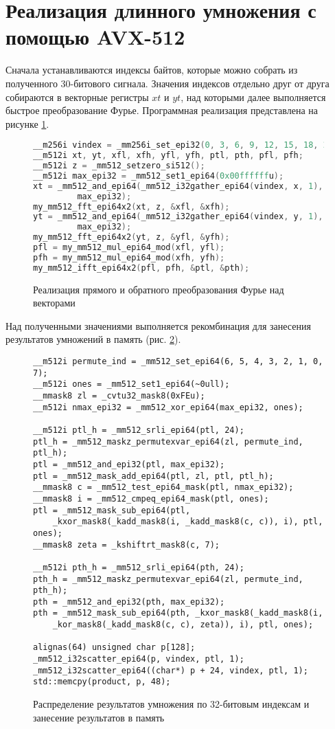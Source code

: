 \section{Реализация длинного умножения с помощью AVX-512}
Сначала устанавливаются индексы байтов, которые можно собрать из полученного 30-битового сигнала.
Значения индексов отдельно друг от друга собираются в векторные регистры $xt$ и $yt$, над которыми далее выполняется быстрое преобразование Фурье.
Программная реализация представлена на рисунке \ref{fig: vectorized ntt}.
\begin{figure}[ht]
\begin{lstlisting}[language=C]
__m256i vindex = _mm256i_set_epi32(0, 3, 6, 9, 12, 15, 18, 21);
__m512i xt, yt, xfl, xfh, yfl, yfh, ptl, pth, pfl, pfh;
__m512i z = _mm512_setzero_si512();
__m512i max_epi32 = _mm512_set1_epi64(0x00ffffffu);
xt = _mm512_and_epi64(_mm512_i32gather_epi64(vindex, x, 1),
         max_epi32);
my_mm512_fft_epi64x2(xt, z, &xfl, &xfh);
yt = _mm512_and_epi64(_mm512_i32gather_epi64(vindex, y, 1),
         max_epi32);
my_mm512_fft_epi64x2(yt, z, &yfl, &yfh);
pfl = my_mm512_mul_epi64_mod(xfl, yfl);
pfh = my_mm512_mul_epi64_mod(xfh, yfh);
my_mm512_ifft_epi64x2(pfl, pfh, &ptl, &pth);
\end{lstlisting}
\caption{Реализация прямого и обратного преобразования Фурье над векторами}
\label{fig: vectorized ntt}
\end{figure}

Над полученными значениями выполняется рекомбинация для занесения результатов умножений в память (рис. \ref{fig: 32 bit vectorized recombination}).
\begin{figure}[ht]
\begin{lstlisting}[language={[11]C++}]
__m512i permute_ind = _mm512_set_epi64(6, 5, 4, 3, 2, 1, 0, 7);
__m512i ones = _mm512_set1_epi64(~0ull);
__mmask8 zl = _cvtu32_mask8(0xFEu);
__m512i nmax_epi32 = _mm512_xor_epi64(max_epi32, ones);

__m512i ptl_h = _mm512_srli_epi64(ptl, 24);
ptl_h = _mm512_maskz_permutexvar_epi64(zl, permute_ind, ptl_h);
ptl = _mm512_and_epi32(ptl, max_epi32);
ptl = _mm512_mask_add_epi64(ptl, zl, ptl, ptl_h);
__mmask8 c = _mm512_test_epi64_mask(ptl, nmax_epi32);
__mmask8 i = _mm512_cmpeq_epi64_mask(ptl, ones);
ptl = _mm512_mask_sub_epi64(ptl,
	_kxor_mask8(_kadd_mask8(i, _kadd_mask8(c, c)), i), ptl, ones);
__mmask8 zeta = _kshiftrt_mask8(c, 7);

__m512i pth_h = _mm512_srli_epi64(pth, 24);
pth_h = _mm512_maskz_permutexvar_epi64(zl, permute_ind, pth_h);
pth = _mm512_and_epi32(pth, max_epi32);
pth = _mm512_mask_sub_epi64(pth, _kxor_mask8(_kadd_mask8(i,
	_kor_mask8(_kadd_mask8(c, c), zeta)), i), ptl, ones);

alignas(64) unsigned char p[128];
_mm512_i32scatter_epi64(p, vindex, ptl, 1);
_mm512_i32scatter_epi64((char*) p + 24, vindex, ptl, 1);
std::memcpy(product, p, 48);
\end{lstlisting}
\caption{Распределение результатов умножения по 32-битовым индексам и занесение результатов в память}
\label{fig: 32 bit vectorized recombination}
\end{figure}

